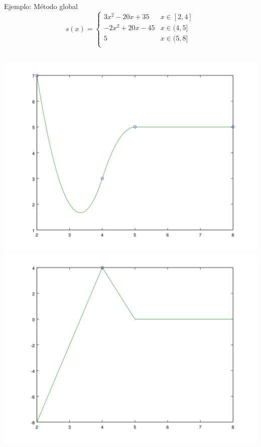 \documentclass[compress]{beamer}
\theoremstyle{definition}
\theoremstyle{remark}
\begin{document}
\begin{frame}{Ejemplo: Método global}
\[
s(x) =
\begin{cases}
 3x^2 - 20x + 35  & x \in [2,4] \\
-2x^2 + 20x - 45 & x \in (4,5] \\
 5  & x \in (5,8] \\
\end{cases}
\]

\vfill

\begin{columns}
\includegraphics[width=\textwidth]{EjemploGlobal.png}
\includegraphics[width=\textwidth]{EjemploGlobalDer.png}
\end{columns}

\end{frame}
\end{document}
